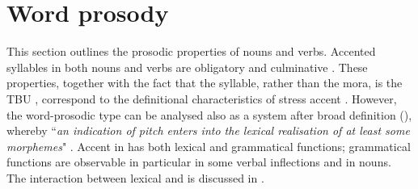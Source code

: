 \documentclass[output=paper]{LSP/langsci}
\begin{document}
\section{Word prosody} \label{sec:Petrollino:3}
This section outlines the prosodic properties of  nouns and verbs. Accented syllables in both nouns and verbs are obligatory and culminative . These properties, together with the fact that the syllable, rather than the mora, is the TBU , correspond to the definitional characteristics of stress accent \citep[231]{Hyman2006}. However, the  word-prosodic type can be analysed also as a  system after  broad definition (\citeyear{Hyman2001}), whereby “\textit{an indication of pitch enters into the lexical realisation of at least some morphemes}" \citep[1367]{Hyman2001}. Accent in  has both lexical and grammatical functions; grammatical functions are observable in particular in some verbal inflections and in  nouns. The interaction between lexical and  is discussed in . 
\end{document}
